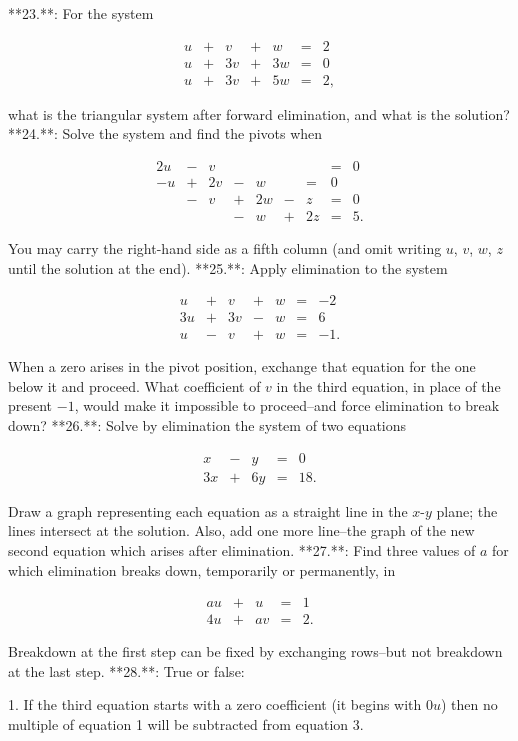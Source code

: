 

**23.**: For the system

\[\begin{array}{ccccccccc}u&+&v&+&w&=&2\\ u&+&3v&+&3w&=&0\\ u&+&3v&+&5w&=&2,\end{array}\]

what is the triangular system after forward elimination, and what is the solution?
**24.**: Solve the system and find the pivots when

\[\begin{array}{ccccccccc}2u&-&v&&&&&=&0\\ -u&+&2v&-&w&&=&0\\ &-&v&+&2w&-&z&=&0\\ &&&-&w&+&2z&=&5.\end{array}\]

You may carry the right-hand side as a fifth column (and omit writing \(u\), \(v\), \(w\), \(z\) until the solution at the end).
**25.**: Apply elimination to the system

\[\begin{array}{ccccccccc}u&+&v&+&w&=&-2\\ 3u&+&3v&-&w&=&6\\ u&-&v&+&w&=&-1.\end{array}\]

When a zero arises in the pivot position, exchange that equation for the one below it and proceed. What coefficient of \(v\) in the third equation, in place of the present \(-1\), would make it impossible to proceed--and force elimination to break down?
**26.**: Solve by elimination the system of two equations

\[\begin{array}{ccccccccc}x&-&y&=&0\\ 3x&+&6y&=&18.\end{array}\]

Draw a graph representing each equation as a straight line in the \(x\)-\(y\) plane; the lines intersect at the solution. Also, add one more line--the graph of the new second equation which arises after elimination.
**27.**: Find three values of \(a\) for which elimination breaks down, temporarily or permanently, in

\[\begin{array}{ccccccccc}au&+&u&=&1\\ 4u&+&av&=&2.\end{array}\]

Breakdown at the first step can be fixed by exchanging rows--but not breakdown at the last step.
**28.**: True or false:

1. If the third equation starts with a zero coefficient (it begins with \(0u\)) then no multiple of equation 1 will be subtracted from equation 3.

